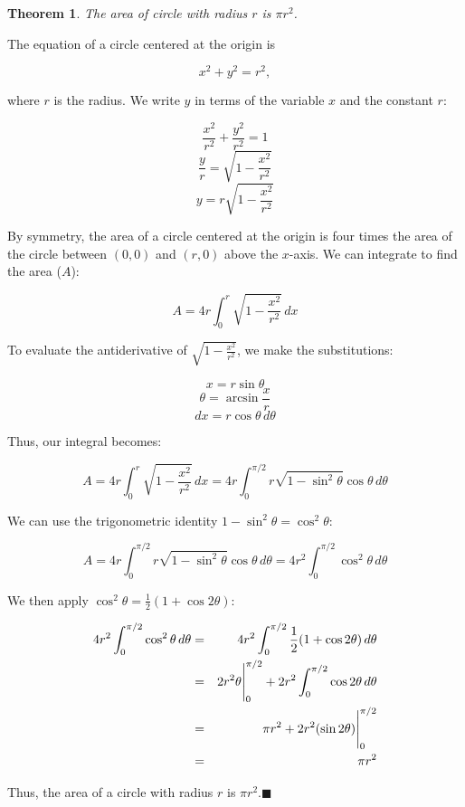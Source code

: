 \newtheorem{prf}{Theorem}

\begin{prf}
The area of circle with radius $r$ is $\pi r^2$.
\end{prf}

 The equation of a circle centered at the
origin is

$$
x^2 + y^2 = r^2,
$$

\noindent where $r$ is the radius.  We  write $y$ in terms of the
variable $x$ and the constant $r$:

$$
\frac{x^2}{r^2} + \frac{y^2}{r^2} = 1
$$
$$
\frac{y}{r} = \sqrt{1-\frac{x^2}{r^2}}
$$
$$
y= r\sqrt {1-\frac{x^2}{r^2}}
$$

By symmetry, the area of a circle centered at the origin is four
times the area of the circle between $(0,0)$ and $(r, 0)$ above the
$x$-axis.  We can integrate to find the area ($A$):

$$
A = 4r\int_0^r \sqrt {1-\frac{x^2}{r^2}}\, dx
$$

To evaluate the antiderivative of $\displaystyle\sqrt
{1-\frac{x^2}{r^2}}$, we make the substitutions:

$$
x = r \sin \theta
$$
$$
\theta = \arcsin \frac{x}{r}
$$
$$
dx = r\cos \theta\, d\theta
$$

Thus, our integral becomes:

$$
A=4r\int_0^r \sqrt {1-\frac{x^2}{r^2}}\, dx = 4r\int_0^{\pi/2}
r\sqrt{1-\sin^2 \theta} \cos \theta\, d\theta
$$

 We can use the trigonometric identity $1 - \sin^2 \theta = \cos^2 \theta$:

$$
A=4r\int_0^{\pi/2} r\sqrt{1-\sin^2 \theta} \cos \theta\, d\theta=
4r^2\int_0^{\pi/2} \cos^2 \theta\, d\theta
$$

We then apply $\cos^2 \theta = \frac{1}{2}(1 + \cos 2\theta)$:

\begin{eqnarray*}
4r^2\int_0^{\pi/2} \cos^2 \theta\, d\theta &=& 4r^2\int_0^{\pi/2}  \frac{1}{2}(1 + \cos 2\theta) \,d\theta\\
& = & {2r^2\theta}\Bigg{|}_0^{\pi/2} + 2r^2\int_0^{\pi/2} \cos 2\theta \,d\theta\\
                                  & = & \pi r^2 + 2r^2(\sin2\theta)\Bigg{|}_0^{\pi/2}\\
                                  & = & \pi r^2
\end{eqnarray*}

Thus, the area of a circle with radius $r$ is $\pi r^2$.\hfill$\blacksquare$

